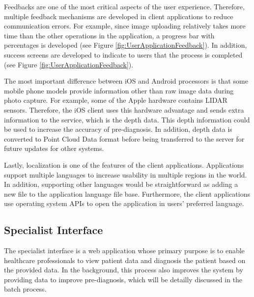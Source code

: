 Feedbacks are one of the most critical aspects of the user experience. Therefore, multiple feedback mechanisms are developed in client applications to reduce communication errors. For example, since image uploading relatively takes more time than the other operations in the application, a progress bar with percentages is developed (see Figure \ref{fig:UserApplicationFeedback}). In addition, success screens are developed to indicate to users that the process is completed (see Figure \ref{fig:UserApplicationFeedback}).

The most important difference between iOS and Android processors is that some mobile phone models provide information other than raw image data during photo capture. For example, some of the Apple hardware contains LIDAR sensors. Therefore, the iOS client uses this hardware advantage and sends extra information to the service, which is the depth data. This depth information could be used to increase the accuracy of pre-diagnosis. In addition, depth data is converted to Point Cloud Data format before being transferred to the server for future updates for other systems.

Lastly, localization is one of the features of the client applications. Applications support multiple languages to increase usability in multiple regions in the world. In addition, supporting other languages would be straightforward as adding a new file to the application language file base. Furthermore, the client applications use operating system APIs to open the application in users' preferred language.

\subsection{Specialist Interface} \label{sec:SpecialistInterface}

The specialist interface is a web application whose primary purpose is to enable healthcare professionals to view patient data and diagnosis the patient based on the provided data. In the background, this process also improves the system by providing data to improve pre-diagnosis, which will be detailly discussed in the batch process. 

